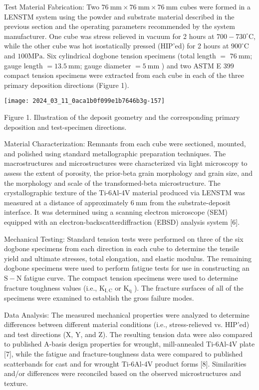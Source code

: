 \documentclass[10pt]{article}
\begin{document}
Test Material Fabrication: Two $76 \mathrm{~mm} \times 76 \mathrm{~mm} \times 76 \mathrm{~mm}$ cubes were formed in a LENSTM system using the powder and substrate material described in the previous section and the operating parameters recommended by the system manufacturer. One cube was stress relieved in vacuum for 2 hours at $700-730^{\circ} \mathrm{C}$, while the other cube was hot isostatically pressed (HIP'ed) for 2 hours at $900^{\circ} \mathrm{C}$ and $100 \mathrm{MPa}$. Six cylindrical dogbone tension specimens (total length $=$ $76 \mathrm{~mm}$; gauge length $=13.5 \mathrm{~mm}$; gauge diameter $=5 \mathrm{~mm}$ ) and two ASTM E 399 compact tension specimens were extracted from each cube in each of the three primary deposition directions (Figure 1).

\begin{center}
\texttt{[image: 2024\_03\_11\_0aca1b0f099e1b7646b3g-157]}
\end{center}

Figure 1. Illustration of the deposit geometry and the corresponding primary deposition and test-specimen directions.

Material Characterization: Remnants from each cube were sectioned, mounted, and polished using standard metallographic preparation techniques. The macrostructures and microstructures were characterized via light microscopy to assess the extent of porosity, the prior-beta grain morphology and grain size, and the morphology and scale of the transformed-beta microstructure. The crystallographic texture of the Ti-6Al-4V material produced via LENSTM was measured at a distance of approximately $6 \mathrm{~mm}$ from the substrate-deposit interface. It was determined using a scanning electron microscope (SEM) equipped with an electron-backscatterdiffraction (EBSD) analysis system [6].

Mechanical Testing: Standard tension tests were performed on three of the six dogbone specimens from each direction in each cube to determine the tensile yield and ultimate stresses, total elongation, and elastic modulus. The remaining dogbone specimens were used to perform fatigue tests for use in constructing an $\mathrm{S}-\mathrm{N}$ fatigue curve. The compact tension specimens were used to determine fracture toughness values (i.e., $\mathrm{K}_{\mathrm{I}, \mathrm{C}}$ or $\mathrm{K}_{\mathrm{q}}$ ). The fracture surfaces of all of the specimens were examined to establish the gross failure modes.

Data Analysis: The measured mechanical properties were analyzed to determine differences between different material conditions (i.e., stress-relieved vs. HIP'ed) and test directions (X, Y, and Z). The resulting tension data were also compared to published A-basis design properties for wrought, mill-annealed Ti-6Al-4V plate [7], while the fatigue and fracture-toughness data were compared to published scatterbands for cast and for wrought Ti-6Al-4V product forms [8]. Similarities and/or differences were reconciled based on the observed microstructures and texture.
\end{document}
